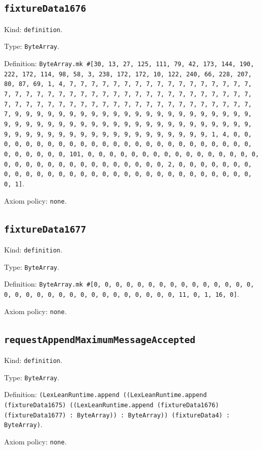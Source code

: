 \documentclass[11pt]{article}
\begin{document}
\subsection*{\texttt{fixtureData1676}}
\noindent Kind: \texttt{definition}.\par
\noindent Type: \texttt{ByteArray}.\par
\noindent Definition: \texttt{ByteArray.mk \#[30, 13, 27, 125, 111, 79, 42, 173, 144, 190, 222, 172, 114, 98, 58, 3, 238, 172, 172, 10, 122, 240, 66, 228, 207, 80, 87, 69, 1, 4, 7, 7, 7, 7, 7, 7, 7, 7, 7, 7, 7, 7, 7, 7, 7, 7, 7, 7, 7, 7, 7, 7, 7, 7, 7, 7, 7, 7, 7, 7, 7, 7, 7, 7, 7, 7, 7, 7, 7, 7, 7, 7, 7, 7, 7, 7, 7, 7, 7, 7, 7, 7, 7, 7, 7, 7, 7, 7, 7, 7, 7, 7, 7, 7, 9, 9, 9, 9, 9, 9, 9, 9, 9, 9, 9, 9, 9, 9, 9, 9, 9, 9, 9, 9, 9, 9, 9, 9, 9, 9, 9, 9, 9, 9, 9, 9, 9, 9, 9, 9, 9, 9, 9, 9, 9, 9, 9, 9, 9, 9, 9, 9, 9, 9, 9, 9, 9, 9, 9, 9, 9, 9, 9, 9, 9, 9, 9, 9, 1, 4, 0, 0, 0, 0, 0, 0, 0, 0, 0, 0, 0, 0, 0, 0, 0, 0, 0, 0, 0, 0, 0, 0, 0, 0, 0, 0, 0, 0, 0, 0, 0, 101, 0, 0, 0, 0, 0, 0, 0, 0, 0, 0, 0, 0, 0, 0, 0, 0, 0, 0, 0, 0, 0, 0, 0, 0, 0, 0, 0, 0, 0, 0, 0, 2, 0, 0, 0, 0, 0, 0, 0, 0, 0, 0, 0, 0, 0, 0, 0, 0, 0, 0, 0, 0, 0, 0, 0, 0, 0, 0, 0, 0, 0, 0, 0, 1]}.\par
\noindent Axiom policy: \texttt{none}.\par
\subsection*{\texttt{fixtureData1677}}
\noindent Kind: \texttt{definition}.\par
\noindent Type: \texttt{ByteArray}.\par
\noindent Definition: \texttt{ByteArray.mk \#[0, 0, 0, 0, 0, 0, 0, 0, 0, 0, 0, 0, 0, 0, 0, 0, 0, 0, 0, 0, 0, 0, 0, 0, 0, 0, 0, 0, 0, 0, 0, 11, 0, 1, 16, 0]}.\par
\noindent Axiom policy: \texttt{none}.\par
\subsection*{\texttt{requestAppendMaximumMessageAccepted}}
\noindent Kind: \texttt{definition}.\par
\noindent Type: \texttt{ByteArray}.\par
\noindent Definition: \texttt{(LexLeanRuntime.append ((LexLeanRuntime.append (fixtureData1675) ((LexLeanRuntime.append (fixtureData1676) (fixtureData1677) : ByteArray)) : ByteArray)) (fixtureData4) : ByteArray)}.\par
\noindent Axiom policy: \texttt{none}.\par
\end{document}
